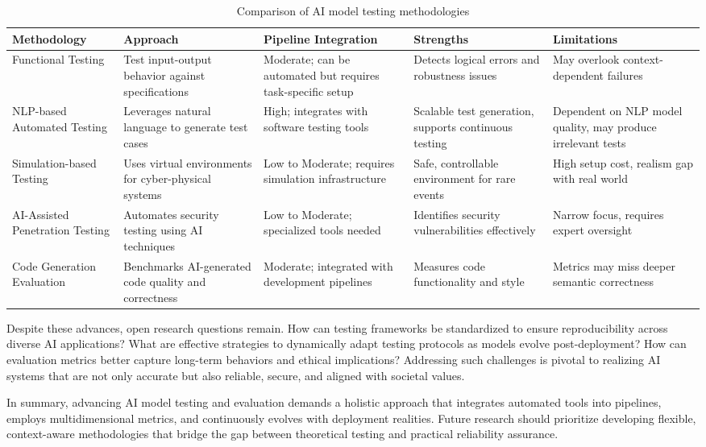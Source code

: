 \documentclass[sigconf]{acmart}
\begin{document}
\begin{table*}[htbp]
\centering
\caption{Comparison of AI model testing methodologies}
\label{tab:testing-methodologies}
\begin{adjustbox}{max width=\textwidth}
\begin{tabular}{@{}lllll@{}}
\toprule
Methodology & Approach & Pipeline Integration & Strengths & Limitations \\ \midrule
Functional Testing & Test input-output behavior against specifications & Moderate; can be automated but requires task-specific setup & Detects logical errors and robustness issues & May overlook context-dependent failures \\
NLP-based Automated Testing & Leverages natural language to generate test cases & High; integrates with software testing tools & Scalable test generation, supports continuous testing & Dependent on NLP model quality, may produce irrelevant tests \\
Simulation-based Testing & Uses virtual environments for cyber-physical systems & Low to Moderate; requires simulation infrastructure & Safe, controllable environment for rare events & High setup cost, realism gap with real world \\
AI-Assisted Penetration Testing & Automates security testing using AI techniques & Low to Moderate; specialized tools needed & Identifies security vulnerabilities effectively & Narrow focus, requires expert oversight \\
Code Generation Evaluation & Benchmarks AI-generated code quality and correctness & Moderate; integrated with development pipelines & Measures code functionality and style & Metrics may miss deeper semantic correctness \\ \bottomrule
\end{tabular}
\end{adjustbox}
\end{table*}

Despite these advances, open research questions remain. How can testing frameworks be standardized to ensure reproducibility across diverse AI applications? What are effective strategies to dynamically adapt testing protocols as models evolve post-deployment? How can evaluation metrics better capture long-term behaviors and ethical implications? Addressing such challenges is pivotal to realizing AI systems that are not only accurate but also reliable, secure, and aligned with societal values.

In summary, advancing AI model testing and evaluation demands a holistic approach that integrates automated tools into pipelines, employs multidimensional metrics, and continuously evolves with deployment realities. Future research should prioritize developing flexible, context-aware methodologies that bridge the gap between theoretical testing and practical reliability assurance.
\end{document}
